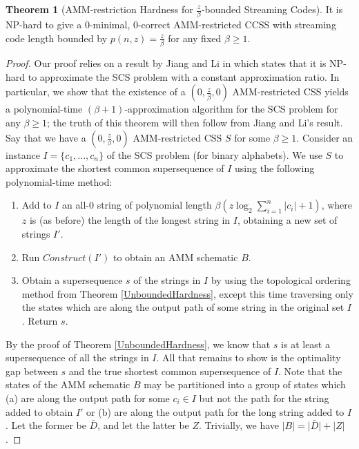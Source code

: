 \documentclass{article}
\theoremstyle{definition}
\newtheorem{theorem}{Theorem}[section]
\begin{document}
\begin{theorem}[AMM-restriction Hardness for $\frac{z}{\beta}$-bounded Streaming Codes]
\label{BoundedHardness}
It is NP-hard to give a 0-minimal, 0-correct AMM-restricted CCSS with streaming 
code length bounded by $p(n,z)=\frac{z}{\beta}$ for any fixed $\beta \geq 1$.
\end{theorem}

\begin{proof}
Our proof relies on a result by Jiang and Li in \cite{SCSResults} which states 
that it is NP-hard to approximate the SCS problem with a constant approximation 
ratio.  In particular, we show that the existence of a $(0, \frac{z}{\beta}, 0)$ AMM-restricted 
CSS yields a polynomial-time 
$(\beta+1)$-approximation algorithm for the SCS problem for any $\beta \geq 1$; 
the truth of this theorem will then follow from Jiang and Li's result.
\newline\newline
Say that we have a $(0, \frac{z}{\beta}, 0)$ AMM-restricted CSS $S$ 
for some $\beta \geq 1$. Consider an instance $I=\{c_1,...,c_n\}$ of the SCS problem 
(for binary alphabets).  We use $S$ to approximate the shortest common supersequence
of $I$ using the following polynomial-time method:

\begin{enumerate}
\item{Add to $I$ an all-0 string of polynomial length $\beta(z \log_2{\sum_{i=1}^{n}\lvert c_i \rvert} + 1)$, where $z$ is (as before)
the length of the longest string in $I$, obtaining a new set of strings $I'$.}
\item{Run $Construct(I')$ to obtain an AMM schematic $B$.}
\item{Obtain a supersequence $s$ of the strings in $I$ by using the topological 
ordering method from Theorem \ref{UnboundedHardness}, except this time traversing
only the states which are along the output path of some string in the original 
set $I$.  Return $s$.}
\end{enumerate}   

By the proof of Theorem \ref{UnboundedHardness}, we know that $s$ is at least a 
supersequence of all the strings in $I$.  All that remains to show is the optimality
gap between $s$ and the true shortest common supersequence of $I$.  Note that the 
states of the AMM schematic $B$ may be partitioned into a group of states which 
(a) are along the output path for some $c_i \in I$ but not the path for the string 
added to obtain $I'$ or (b) are along the output path for the long string added to 
$I$.  Let the former be $\bar{D}$, and let the latter be $Z$.  Trivially, 
we have $\lvert B \rvert = \lvert \bar{D} \rvert + \lvert Z \rvert$.  


\end{proof}
\end{document}
